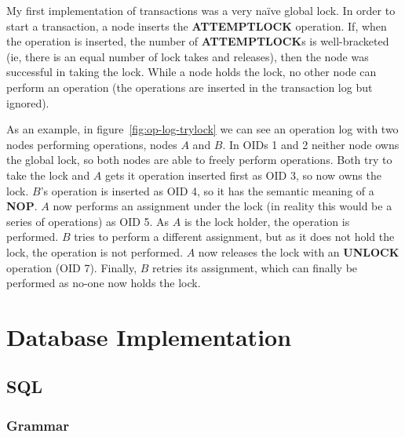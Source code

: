 \documentclass[12pt,twoside,notitlepage]{report}
\newcommand{\op}[1]  {{\bf #1}}         %
\begin{document}

My first implementation of transactions was a very na\"ive global lock. In order to start a
transaction, a node inserts the \op{ATTEMPTLOCK} operation. If, when the operation is inserted, the
number of \op{ATTEMPTLOCK}s is well-bracketed (ie, there is an equal number of lock takes and
releases), then the node was successful in taking the lock. While a node holds the lock, no other
node can perform an operation (the operations are inserted in the transaction log but ignored).

As an example, in figure~\ref{fig:op-log-trylock} we can see an operation log with two nodes
performing operations, nodes $A$ and $B$. In OIDs 1 and 2 neither node owns the global lock, so both
nodes are able to freely perform operations. Both try to take the lock and $A$ gets it operation
inserted first as OID 3, so now owns the lock. $B$'s operation is inserted as OID 4, so it has the
semantic meaning of a \op{NOP}. $A$ now performs an assignment under the lock (in reality this
would be a series of operations) as OID 5. As $A$ is the lock holder, the operation is performed.
$B$ tries to perform a different assignment, but as it does not hold the lock, the operation is
not performed. $A$ now releases the lock with an \op{UNLOCK} operation (OID 7). Finally, $B$
retries its assignment, which can finally be performed as no-one now holds the lock.

%
%
%
%

\section{Database Implementation}

\subsection{SQL}


\subsubsection{Grammar}
\end{document}
